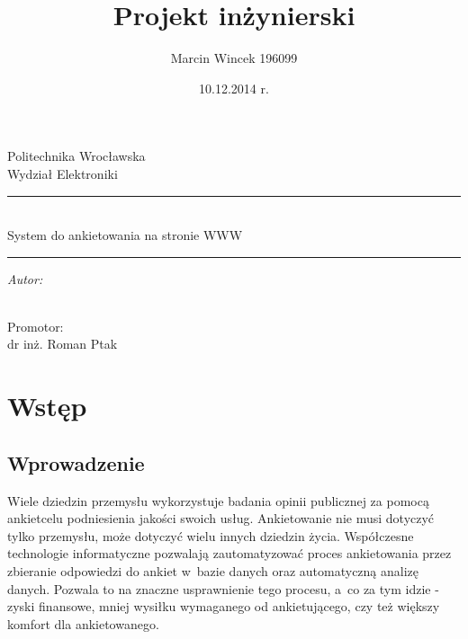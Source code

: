 \documentclass[12pt,a4paper,notitlepage]{article}
\begin{document}
\makeatletter
\newcommand{\linia}{\rule{\linewidth}{0.4mm}}
\renewcommand{\maketitle}{\begin{titlepage}
    \vspace*{1cm}
    \begin{center}\small
    Politechnika Wrocławska\\
    Wydział Elektroniki
    \end{center}
    \vspace{3cm}
    \noindent\linia
    \begin{center}
      \LARGE \textsc{\@title}\\
      \large System do ankietowania na stronie WWW
         \end{center}
     \linia
    \vspace{0.5cm}
    \begin{flushright}
    \begin{minipage}{6cm}
    \textit{\small Autor:}\\
    \normalsize \textsc{\@author} \par
    \end{minipage}
    \vspace{5cm}\\
     {\small Promotor:}\\
         dr inż. Roman Ptak
     \end{flushright}
    \vspace*{\stretch{6}}
    \begin{center}
    \@date
    \end{center}
  \end{titlepage}%
}
\makeatother
\author{Marcin Wincek 196099 }
\title{Projekt inżynierski}
\date{10.12.2014 r.}

\maketitle

\setcounter{page}{2}
\tableofcontents



\section{Wstęp}
\subsection{Wprowadzenie}
Wiele dziedzin przemysłu wykorzystuje badania opinii publicznej za pomocą ankietcelu podniesienia jakości swoich usług. Ankietowanie nie musi dotyczyć tylko przemysłu, może dotyczyć wielu innych dziedzin życia. Współczesne technologie informatyczne pozwalają zautomatyzować proces ankietowania przez zbieranie odpowiedzi do ankiet w~bazie danych oraz automatyczną analizę danych. Pozwala to na znaczne usprawnienie tego procesu, a~co za tym idzie - zyski finansowe, mniej wysiłku wymaganego od ankietującego, czy też większy komfort dla ankietowanego. 
\end{document}
